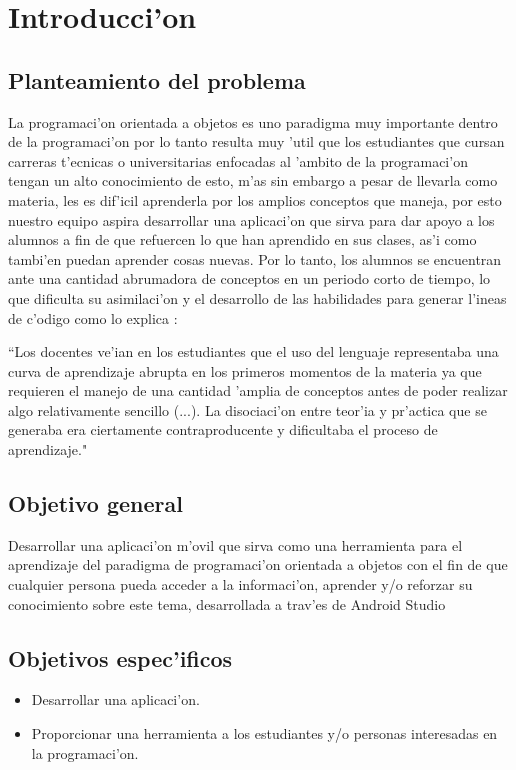 \chapter{Introducci'on}

\section{Planteamiento del problema}
La programaci'on orientada a objetos es uno paradigma muy importante dentro de la programaci'on por lo tanto resulta muy 'util que los estudiantes que cursan carreras t'ecnicas o universitarias enfocadas al 'ambito de la programaci'on tengan un alto conocimiento de esto, m'as sin embargo a pesar de llevarla como materia, les es dif'icil aprenderla por los amplios conceptos que maneja, por esto nuestro equipo aspira desarrollar una aplicaci'on que sirva para dar apoyo a los alumnos a fin de que refuercen lo que han aprendido en sus clases, as'i como tambi'en puedan aprender cosas nuevas.
Por lo tanto, los alumnos se encuentran ante una cantidad abrumadora de conceptos en un periodo corto de tiempo, lo que dificulta su asimilaci'on y el desarrollo de las habilidades para generar l'ineas de c'odigo como lo explica \cite{spigariol2013ensenando}:

``Los docentes ve'ian en los estudiantes que el uso del lenguaje representaba una curva de aprendizaje abrupta en los primeros momentos de la materia ya que requieren el manejo de una cantidad 'amplia de conceptos antes de poder realizar algo relativamente sencillo (...). La disociaci'on entre teor'ia y pr'actica que se generaba era ciertamente contraproducente y dificultaba el proceso de aprendizaje."

\section{Objetivo general}
Desarrollar una aplicaci'on m'ovil que sirva como una herramienta para el aprendizaje del paradigma de programaci'on orientada a objetos con el fin de que cualquier persona pueda acceder a la informaci'on, aprender y/o reforzar su conocimiento sobre este tema, desarrollada a trav'es de Android Studio 

\section{Objetivos espec'ificos} 
\begin{itemize}
\item Desarrollar una aplicaci'on.
\item Proporcionar una herramienta a los estudiantes y/o personas interesadas en la programaci'on.
\end{itemize}
